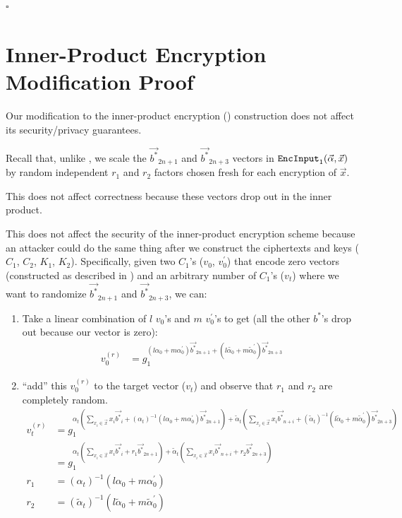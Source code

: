 \documentclass[pdftex,12pt,a4papaer,twoside,notitlepage]{report}
\DeclareMathOperator{\ein}{\mathtt{EncInput}}
\begin{document}
\begin{appendices}
{\hfill $\square$}

\section{Inner-Product Encryption Modification Proof}
\label{proof:signature-modification}

Our modification to the inner-product encryption (\cite{inner-product})
construction does not affect its security/privacy guarantees.

Recall that, unlike \cite{inner-product}, we scale the $\vec{b^*}_{2n+1}$ and
$\vec{b^*}_{2n+3}$ vectors in $\ein_1(\Ap, \vec{x})$ by random independent $r_1$
and $r_2$ factors chosen fresh for each encryption of $\vec{x}$.

This does not affect correctness because these vectors drop out in the inner
product.

This does not affect the security of the inner-product encryption scheme because
an attacker could do the same thing after we construct the ciphertexts and keys
($C_1$, $C_2$, $K_1$, $K_2$). Specifically, given two $C_1$'s ($v_0$,
$v_0^\prime$) that encode zero vectors (constructed as described in
\cite{inner-product}) and an arbitrary number of $C_1$'s ($v_t$) where we want
to randomize $\vec{b^*}_{2n+1}$ and $\vec{b^*}_{2n+3}$, we can:

\begin{enumerate}
\item Take a linear combination of $l$ $v_0$'s and $m$ $v_0^\prime$'s to get
  (all the other $b^*$'s drop out because our vector is zero):
  \begin{align*}
    v_0^{(r)} &= g_1^{(l\alpha_0 + m\alpha_0^\prime) \vec{b^*}_{2n+1} + (l\tilde{\alpha_0} + m\tilde{\alpha}_0^\prime)\vec{b^*}_{2n+3}}
  \end{align*}
\item ``add'' this $v_0^{(r)}$ to the target vector ($v_t$) and observe
  that $r_1$ and $r_2$ are completely random.
  \begin{align*}
    v_t^{(r)} &= g_1^{\alpha_t(\sum_{x_i \in \vec{x}}{x_i\vec{b^*}_i} +
      (\alpha_t)^{-1}(l\alpha_0 + m\alpha_0^\prime) \vec{b^*}_{2n+1}) +
      \tilde{\alpha}_t(\sum_{x_i \in \vec{x}}{x_i\vec{b^*}_{n+i}} +
      (\tilde{\alpha}_t)^{-1}(l\tilde{\alpha}_0 +
      m\tilde{\alpha}_0^\prime)\vec{b^*}_{2n+3})} \\
              &= g_1^{\alpha_t(\sum_{x_i \in \vec{x}}{x_i\vec{b^*}_i} +
      r_1 \vec{b^*}_{2n+1}) +
      \tilde{\alpha}_t(\sum_{x_i \in \vec{x}}{x_i\vec{b^*}_{n+i}} +
      r_2 \vec{b^*}_{2n+3})} \\
    r_1 &=  (\alpha_t)^{-1}(l\alpha_0 + m\alpha_0^\prime) \\
    r_2 &=  (\tilde{\alpha}_t)^{-1}(l\tilde{\alpha}_0 + m\tilde{\alpha}_0^\prime) \\
  \end{align*}
\end{enumerate}


\end{appendices}
\end{document}
